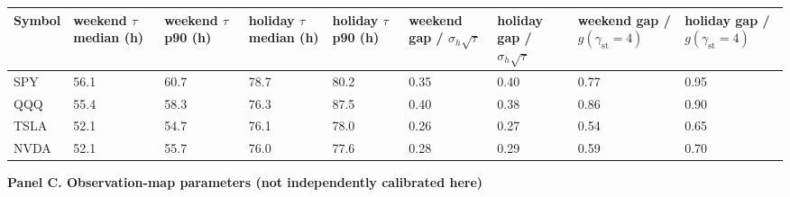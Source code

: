 \begin{table}[!htbp]
\begin{adjustbox}{max width=\linewidth}
\begin{tabular}{@{}lllllllll@{}}
\toprule
Symbol & \makecell{weekend $\tau$\\median (h)} & \makecell{weekend $\tau$\\p90 (h)} & \makecell{holiday $\tau$\\median (h)} & \makecell{holiday $\tau$\\p90 (h)} & \makecell{weekend gap /\\$\sigma_h\sqrt{\tau}$} & \makecell{holiday gap /\\$\sigma_h\sqrt{\tau}$} & \makecell{weekend gap /\\$g(\gamma_{\mathrm{st}}=4)$} & \makecell{holiday gap /\\$g(\gamma_{\mathrm{st}}=4)$} \\
\midrule
SPY & 56.1 & 60.7 & 78.7 & 80.2 & 0.35 & 0.40 & 0.77 & 0.95 \\
QQQ & 55.4 & 58.3 & 76.3 & 87.5 & 0.40 & 0.38 & 0.86 & 0.90 \\
TSLA & 52.1 & 54.7 & 76.1 & 78.0 & 0.26 & 0.27 & 0.54 & 0.65 \\
NVDA & 52.1 & 55.7 & 76.0 & 77.6 & 0.28 & 0.29 & 0.59 & 0.70 \\
\bottomrule
\end{tabular}
\end{adjustbox}
\vspace{0.5em}
\par\textbf{Panel C. Observation-map parameters (not independently calibrated here)}


\end{table}
